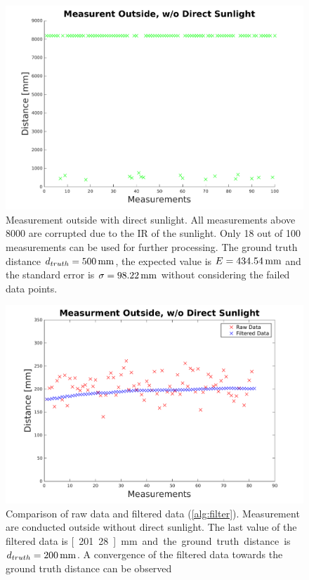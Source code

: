 \begin{figure}
	\centering
	\includegraphics[width=0.9\linewidth]{pictures/plot_out_sun.pdf}
	\caption{Measurement outside with direct sunlight. All measurements above 8000 are corrupted due to the IR of the sunlight. Only 18 out of 100 measurements can be used for further processing. The ground truth distance $d_{truth}=\unit[500]{mm}$, the expected value is $E=\unit[434.54]{mm}$ and the standard error is $\sigma=\unit[98.22]{mm}$ without considering the failed data points.}
	\label{fig:meas_out_sun}
\end{figure}

\begin{figure}
	\centering
	\includegraphics[width=0.9\linewidth]{pictures/plot_filter_shadow.pdf}
	\caption{Comparison of raw data and filtered data (\cref{alg:filter}). Measurement are conducted outside without direct sunlight. The last value of the filtered data is \unit[201.28]{mm} and the ground truth distance is $d_{truth}=\unit[200]{mm}$. A convergence of the filtered data towards the ground truth distance can be observed}
	\label{fig:meas_out_shadow filter}
\end{figure}

